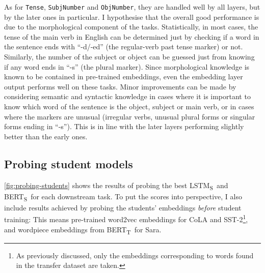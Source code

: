 \documentclass[bsc,frontabs,singlespacing,parskip,deptreport]{infthesis}
\def\BERTT{BERT\textsubscript{T}}
\def\BERTS{BERT\textsubscript{S}}
\def\LSTMS{LSTM\textsubscript{S}}
\begin{document}
{{{      As for \verb|Tense|, \verb|SubjNumber| and \verb|ObjNumber|, they are handled well by all layers, but by the later ones in particular. I hypothesise that the overall good performance is due to the morphological component of the tasks. Statistically, in most cases, the tense of the main verb in English can be determined just by checking if a word in the sentence ends with ``-d/-ed'' (the regular-verb past tense marker) or not. Similarly, the number of the subject or object can be guessed just from knowing if any word ends in ``-s'' (the plural marker). Since morphological knowledge is known to be contained in pre-trained embeddings, even the embedding layer output performs well on these tasks. Minor improvements can be made by considering semantic and syntactic knowledge in cases where it is important to know which word of the sentence is the object, subject or main verb, or in cases where the markers are unusual (irregular verbs, unusual plural forms or singular forms ending in ``-s''). This is in line with the later layers performing slightly better than the early ones.
    }

    \subsection{Probing student models}{
      \autoref{fig:probing-students} shows the results of probing the best \LSTMS~and \BERTS~for each downstream task. To put the scores into perspective, I also include results achieved by probing the students' embeddings \textit{before} student training: This means pre-trained word2vec embeddings for CoLA and SST-2\footnote{As previously discussed, only the embeddings corresponding to words found in the transfer dataset are taken.}, and wordpiece embeddings from \BERTT~for Sara.
      
}}}
\end{document}
